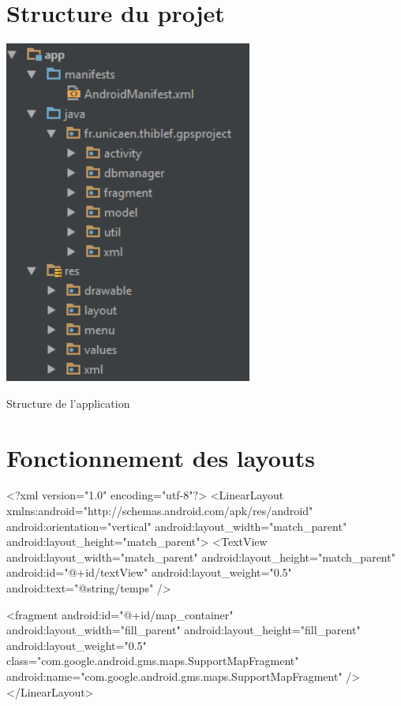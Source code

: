 \section{Structure du projet}
\bigskip
\begin{multicols}{2}
\begin{img}
  \includegraphics[scale=0.5]{img/archi.png}
  \caption{Structure de l'application}
\end{img}

\end{multicols}

\section{Fonctionnement des layouts}
\begin{xml}
<?xml version="1.0" encoding="utf-8"?>
<LinearLayout xmlns:android="http://schemas.android.com/apk/res/android"
    android:orientation="vertical" android:layout_width="match_parent"
    android:layout_height="match_parent">	
	<TextView
    	android:layout_width="match_parent"
        android:layout_height="match_parent"
        android:id="@+id/textView"
        android:layout_weight="0.5"
        android:text="@string/temps" />
                
    <fragment
        android:id="@+id/map_container"
        android:layout_width="fill_parent"
        android:layout_height="fill_parent"
        android:layout_weight="0.5"
        class="com.google.android.gms.maps.SupportMapFragment"
        android:name="com.google.android.gms.maps.SupportMapFragment" />
</LinearLayout>
\end{xml}
\section{}


